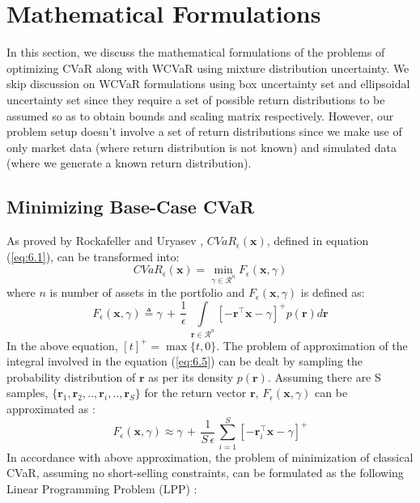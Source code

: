 \section{Mathematical Formulations}
In this section, we discuss the mathematical formulations of the problems of optimizing CVaR along with WCVaR using mixture distribution uncertainty. We skip discussion on WCVaR formulations using box uncertainty set and ellipsoidal uncertainty set since they require a set of possible return distributions to be assumed so as to obtain bounds and scaling matrix respectively. However, our problem setup doesn't involve a set of return distributions since we make use of only market data (where return distribution is not known) and simulated data (where we generate a known return distribution).

\subsection {Minimizing Base-Case CVaR}
As proved by Rockafeller and Uryasev \cite{rockafellar1} , $CVaR_{\epsilon}(\mathbf{x})$, defined in equation (\ref{eq:6.1}), can be transformed into: 
\begin{equation}
\label{eq:6.4}
CVaR_{\epsilon}(\mathbf{x}) = \min_{\gamma \in \mathcal{R}^{n}} F_{\epsilon}(\mathbf{x},\gamma)
\end{equation}
where $n$ is number of assets in the portfolio and $F_{\epsilon}(\mathbf{x},\gamma)$ is defined as:
\begin{equation}
\label{eq:6.5}
 F_{\epsilon}(\mathbf{x},\gamma) \triangleq \gamma \, + \, \frac{1}{\epsilon} \, \int \limits_{\mathbf{r} \in \mathcal{R}^{n}} [-\mathbf{r}^{\top}\mathbf{x}-\gamma]^{+} p(\mathbf{r})  d\mathbf{r}
\end{equation}
In the above equation, $[t]^{+}=\max \{t,0\}$. The problem of approximation of the integral involved in the equation (\ref{eq:6.5}) can be dealt by sampling the probability distribution of $\mathbf{r}$ as per its density $p(\mathbf{r})$. Assuming there are S samples, $\{ \mathbf{r}_{1}, \mathbf{r}_{2}, .., \mathbf{r}_{i},..,\mathbf{r}_{S}\}$ for the return vector $\mathbf{r}$, $ F_{\epsilon}(\mathbf{x},\gamma)$ can be approximated as \cite{rockafellar1}:
\begin{equation}
\label{eq:6.6}
 F_{\epsilon}(\mathbf{x},\gamma) \approx \gamma \, + \, \frac{1}{S \, \epsilon} \, \sum_{i=1}^{S} [-\mathbf{r}_{i}^{\top}\mathbf{x}-\gamma]^{+} 
\end{equation}
In accordance with above approximation, the problem of minimization of classical CVaR, assuming no short-selling constraints, can be formulated as the following Linear Programming Problem (LPP) \cite{rockafellar1,zhu}:
